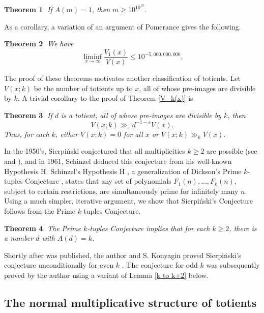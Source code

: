 \documentclass[11pt]{amsart}
\theoremstyle{remark}
\theoremstyle{plain}
\newtheorem{thm}{Theorem}
\numberwithin{equation}{section}
\newcommand{\e}{\ensuremath{\varepsilon}}
\renewcommand{\(}{\left(}
\renewcommand{\)}{\right)}
\renewcommand{\le}{\leqslant}
\renewcommand{\ge}{\geqslant}
\begin{document}
\begin{thm}\label{CC lower}  If $A(m)=1$,
then $m \ge 10^{10^{10}}$.
\end{thm}

As a corollary, a variation of an argument of Pomerance \cite{P2} gives the
following.

\begin{thm}\label{liminf V_1/V} We have
$$
\liminf_{x\to\infty} \frac{V_1(x)}{V(x)} \le 10^{-5,000,000,000}.
$$
\end{thm}

The proof of these theorems
motivates another classification of totients.  Let $V(x;k)$
be the number of totients up to $x$, all of whose pre-images are divisible
by $k$.  A trivial corollary to the proof of Theorem \ref{V_k(x)} is

\begin{thm}\label{V(x;k)}
If $d$ is a totient, all of whose pre-images are
divisible by $k$, then 
$$
V(x;k) \gg_\e d^{-1-\e} V(x).
$$
Thus, for each $k$, either $V(x;k)=0$ for all $x$ or
$V(x;k)\gg_k V(x)$.
\end{thm}

In the 1950's, Sierpi\'nski
conjectured that all multiplicities $k\ge 2$ are possible (see \cite{S1}
and \cite{E3}),
and in 1961, Schinzel \cite{S2}
deduced this conjecture from his well-known Hypothesis H.  Schinzel's
Hypothesis H \cite{SS}, a generalization of Dickson's Prime $k$-tuples
Conjecture \cite{D}, states that any set of polynomials $F_1(n),\ldots,
F_k(n)$, subject to certain restrictions, are simultaneously prime for
infinitely many $n$.  Using a much simpler, iterative argument, we show that
Sierpi\'nski's Conjecture follows from the Prime $k$-tuples Conjecture.

\begin{thm}\label{Sierp Conj} The Prime $k$-tuples Conjecture implies 
that for each $k \ge 2$, there is a number $d$ with $A(d)=k$.
\end{thm}

Shortly after \cite{F98} was published, the author and S. Konyagin
proved Sierpi\'nski's conjecture unconditionally for even $k$ \cite{FK}.
The conjecture for odd $k$ was subsequently proved by the author \cite{F99}
using a variant of Lemma \ref{k to k+2} below.




\subsection{The normal multiplicative structure of totients}
\end{document}

